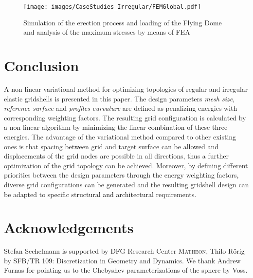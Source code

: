 \documentclass[Thesis.tex]{subfiles}
\begin{document}
\begin{figure}
\centering
\texttt{[image: images/CaseStudies\_Irregular/FEMGlobal.pdf]}
\caption{Simulation of the erection process and loading of the Flying Dome and analysis of the maximum stresses by means of FEA}
\label{fig:FEMGlobal}
\end{figure}


\section{Conclusion}

A non-linear variational method for optimizing topologies of regular and irregular elastic gridshells is presented in this paper. The design parameters {\it mesh size}, {\it reference surface} and {\it profiles curvature} are defined as penalizing energies with corresponding weighting factors. The resulting grid configuration is calculated by a non-linear algorithm by minimizing the linear combination of these three energies. The advantage of the variational method compared to other existing ones is that spacing between grid and target surface can be allowed and displacements of the grid nodes are possible in all directions, thus a further optimization of the grid topology can be achieved. Moreover, by defining different priorities between the design parameters through the energy weighting factors, diverse grid configurations can be generated and the resulting gridshell design can be adapted to specific structural and architectural requirements. 

\section*{Acknowledgements}
Stefan Sechelmann is supported by DFG Research Center \textsc{Matheon}, Thilo R\"orig by SFB/TR 109: Discretization in Geometry and Dynamics.
We thank Andrew Furnas for pointing us to the Chebyshev parameterizations of the sphere by Voss. 

\subfilebibliography
\end{document}
